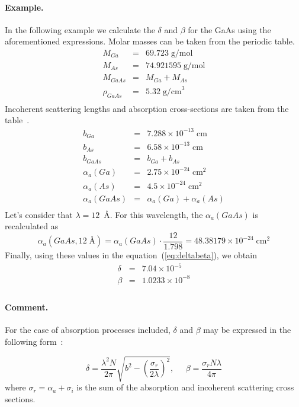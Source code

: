 \paragraph{Example.} In the following example we calculate the $\delta$ and $\beta$ for the GaAs using the aforementioned expressions. Molar masses can be taken from the periodic table.
\begin{eqnarray*}
M_{Ga} &=& 69.723 \;\text{g/mol} \\
M_{As} &=& 74.921595 \;\text{g/mol} \\
M_{GaAs} &=& M_{Ga} + M_{As} \\
\rho_{GaAs} &=& 5.32 \;\text{g/cm}^3 \\
\end{eqnarray*}
Incoherent scattering lengths and absorption cross-sections are taken from the table~\cite{Sea92online}.
\begin{eqnarray*}
b_{Ga} &=& 7.288\times 10^{-13}\;\text{cm} \\
b_{As} &=& 6.58\times 10^{-13}\;\text{cm} \\
b_{GaAs} &=& b_{Ga} + b_{As} \\
\alpha_a(Ga) &=& 2.75\times 10^{-24}\;\text{cm}^2 \\
\alpha_a(As) &=& 4.5\times 10^{-24}\;\text{cm}^2 \\
\alpha_a(GaAs) &=& \alpha_a(Ga) + \alpha_a(As) \\
\end{eqnarray*}
Let's consider that $\lambda = 12$~\AA. For this wavelength, the $\alpha_a(GaAs)$ is recalculated as
\begin{equation*}
\alpha_a(GaAs, 12\;\text{\AA}) = \alpha_a(GaAs)\cdot\frac{12}{1.798} = 48.38179\times 10^{-24}\;\text{cm}^2
\end{equation*}
Finally, using these values in the equation~(\ref{eq:deltabeta}), we obtain
\begin{eqnarray*}
\delta &=& 7.04\times 10^{-5} \\
\beta &=& 1.0233\times 10^{-8} \\
\end{eqnarray*}


\paragraph{Comment.} For the case of absorption processes included, $\delta$ and $\beta$ may be expressed in the following form~\cite{RaWa00}:

\begin{equation}
\delta = \frac{\lambda^2 N}{2\pi}\sqrt{b^2 - \left(\frac{\sigma_r}{2\lambda}\right)^2}, \;\;\;\;\; \beta = \frac{\sigma_rN\lambda}{4\pi}
\end{equation}
where $\sigma_r = \alpha_a + \sigma_i$ is the sum of the absorption and incoherent scattering cross sections.

